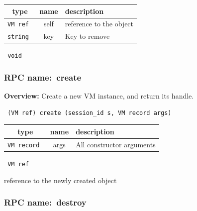 
 
\vspace{0.3cm}
\begin{tabular}{|c|c|p{7cm}|}
 \hline
{\bf type} & {\bf name} & {\bf description} \\ \hline
{\tt VM ref } & self & reference to the object \\ \hline 

{\tt string } & key & Key to remove \\ \hline 

\end{tabular}

\vspace{0.3cm}

{\tt 
void
}



\vspace{0.3cm}
\vspace{0.3cm}
\vspace{0.3cm}
\subsubsection{RPC name:~create}

{\bf Overview:} 
Create a new VM instance, and return its handle.

\begin{verbatim} (VM ref) create (session_id s, VM record args)\end{verbatim}



 
\vspace{0.3cm}
\begin{tabular}{|c|c|p{7cm}|}
 \hline
{\bf type} & {\bf name} & {\bf description} \\ \hline
{\tt VM record } & args & All constructor arguments \\ \hline 

\end{tabular}

\vspace{0.3cm}

{\tt 
VM ref
}


reference to the newly created object
\vspace{0.3cm}
\vspace{0.3cm}
\vspace{0.3cm}
\subsubsection{RPC name:~destroy}

